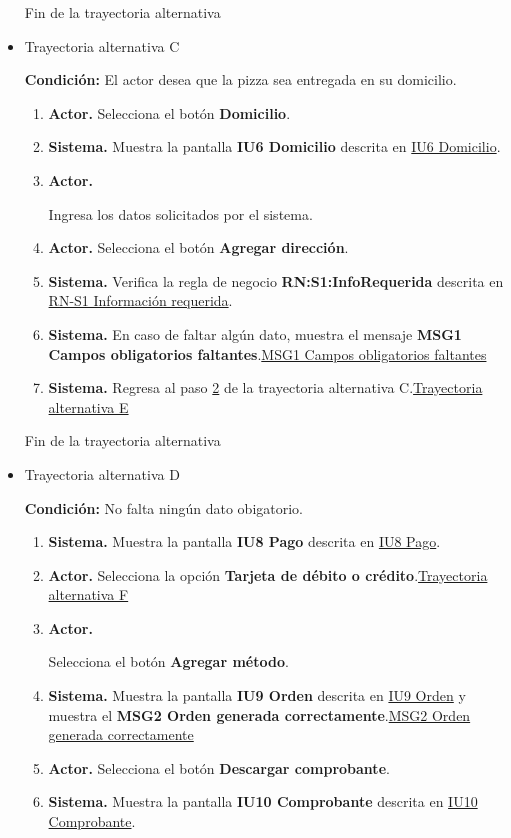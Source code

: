 \begin{itemize}
\begin{enumerate}
			\end{enumerate}
			
			Fin de la trayectoria alternativa
			
		\item \hypertarget{CU1:TAC}{Trayectoria alternativa C}
		
		\noindent \textbf{Condición:} El actor desea que la pizza sea entregada en su domicilio.
		
		\begin{enumerate}
			
			\item \textbf{Actor.} Selecciona el botón
			\textbf{Domicilio}. 
			\item  \textbf{Sistema.} Muestra la pantalla \textbf{IU6 Domicilio} descrita en \hyperlink{IU6}{IU6 Domicilio}.
			\item \hypertarget{CU1:TAC:P2}{\textbf{Actor.}} Ingresa los datos solicitados por el sistema.
			\item \textbf{Actor.} Selecciona el botón \textbf{Agregar dirección}.
			\item \textbf{Sistema.} Verifica la regla de negocio \textbf{RN:S1:InfoRequerida} descrita en \hyperlink{RN:S1:InfoRequerida}{RN-S1 Información requerida}.
			\item \textbf{Sistema.} En caso de faltar algún dato, muestra el mensaje \textbf{MSG1 Campos obligatorios faltantes}.\hyperlink{MSG1:CamposObligatorios}{MSG1 Campos obligatorios faltantes}
			\item \textbf{Sistema.} Regresa al paso \hyperlink{CU1:TAC:P2}{2} de la trayectoria alternativa C.\hyperlink{CU1:TAE}{Trayectoria alternativa E}
		\end{enumerate}
		
		Fin de la trayectoria alternativa
		
		
		\item \hypertarget{CU1:TAD}{Trayectoria alternativa D}
		
		\noindent \textbf{Condición:} No falta ningún dato obigatorio.
		
		\begin{enumerate}
			
			\item \textbf{Sistema.} Muestra la pantalla \textbf{IU8 Pago} descrita en \hyperlink{IU8}{IU8 Pago}.
			\item \textbf{Actor.} Selecciona la opción \textbf{Tarjeta de débito o crédito}.\hyperlink{CU1:TAE}{Trayectoria alternativa F}
			\item \hypertarget{CU1:TAD:P3}{\textbf{Actor.}} Selecciona el botón \textbf{Agregar método}.
			\item \textbf{Sistema.} Muestra la pantalla \textbf{IU9 Orden} descrita en \hyperlink{IU9}{IU9 Orden} y muestra el \textbf{MSG2 Orden generada correctamente}.\hyperlink{MSG2:OrdenCorrecta}{MSG2 Orden generada correctamente}
			\item \textbf{Actor.} Selecciona el botón \textbf{Descargar comprobante}.
			\item \textbf{Sistema.} Muestra la pantalla \textbf{IU10 Comprobante} descrita en \hyperlink{IU10}{IU10 Comprobante}.
			

\end{enumerate}
\end{itemize}
